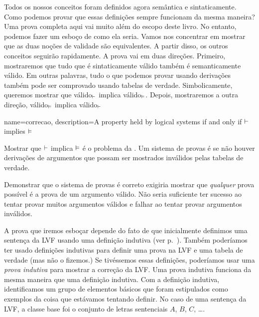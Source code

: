 Todos os nossos conceitos foram definidos agora sem\^antica e sintaticamente. Como podemos provar que essas defini\c c\~oes sempre funcionam da mesma maneira? Uma prova completa aqui vai muito al\'em do escopo deste livro. No entanto, podemos fazer um esbo\c co de como ela seria. Vamos nos concentrar em mostrar que as duas no\c c\~oes de validade s\~ao equivalentes. A partir disso, os outros conceitos seguir\~ao rapidamente. A prova vai em duas dire\c c\~oes. Primeiro,  mostraremos que tudo que \'e sintaticamente v\'alido tamb\'em \'e semanticamente v\'alido. Em outras palavras, tudo o que podemos provar usando deriva\c c\~oes tamb\'em pode ser comprovado usando tabelas de verdade. Simbolicamente,  queremos mostrar que  v\'alido$_{\vdash}$ implica v\'alido$_{\vDash}$. Depois, mostraremos a outra  dire\c c\~ao, v\'alido$_{\vDash}$ implica v\'alido$_{\vdash}$

  

{
name=correcao,
description={A property held by logical systems if and only if $\vdash $ implies $\vDash $}
}

Mostrar que $\vdash $ implica  $\vDash $  \'e  o problema da . \label{def:soundness} Um sistema de provas \'e   se n\~ao houver deriva\c c\~oes de argumentos que possam ser mostrados inv\'alidos pelas tabelas de verdade. 
 \label{def_Soundness} 

Demonstrar que o sistema de provas \'e correto exigiria mostrar que  \emph{qualquer} prova poss\'ivel \'e a prova de um argumento v\'alido. N\~ao seria suficiente ter sucesso ao tentar provar muitos argumentos v\'alidos e falhar ao tentar provar argumentos inv\'alidos.

A prova que iremos esbo\c car depende do fato de que inicialmente definimos uma senten\c ca da LVF usando uma defini\c c\~ao indutiva (ver p.~\pageref{TFLsentences}). Tamb\'em poder\'iamos ter usado defini\c c\~oes indutivas para definir uma prova na LVF e uma tabela de verdade (mas n\~ao o fizemos.)  Se tiv\'essemos essas defini\c c\~oes, poder\'iamos usar uma \emph{prova indutiva} para mostrar a corre\c c\~ao da LVF. Uma prova indutiva funciona da mesma maneira que uma defini\c c\~ao indutiva. Com a defini\c c\~ao indutiva, identificamos um grupo de elementos b\'asicos que foram estipulados como exemplos da coisa que est\'avamos tentando definir. No caso de uma senten\c ca da LVF, a classe base foi o conjunto de letras sentenciais $A$, $B$, $C$, \dots. 

